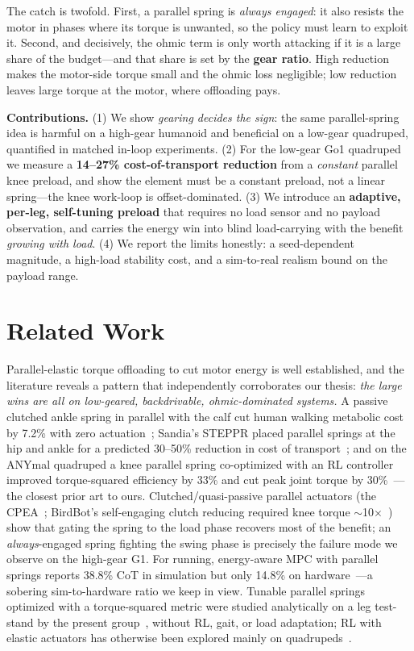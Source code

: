 \documentclass[journal]{IEEEtran}
\begin{document}
The catch is twofold. First, a parallel spring is \emph{always engaged}: it also resists the motor in phases
where its torque is unwanted, so the policy must learn to exploit it. Second, and decisively, the ohmic term is
only worth attacking if it is a large share of the budget---and that share is set by the \textbf{gear ratio}.
High reduction makes the motor-side torque small and the ohmic loss negligible; low reduction leaves large
torque at the motor, where offloading pays.

\textbf{Contributions.}
(1) We show \emph{gearing decides the sign}: the same parallel-spring idea is harmful on a high-gear humanoid
and beneficial on a low-gear quadruped, quantified in matched in-loop experiments.
(2) For the low-gear Go1 quadruped we measure a \textbf{14--27\% cost-of-transport reduction} from a
\emph{constant} parallel knee preload, and show the element must be a constant preload, not a linear
spring---the knee work-loop is offset-dominated.
(3) We introduce an \textbf{adaptive, per-leg, self-tuning preload} that requires no load sensor and no payload
observation, and carries the energy win into blind load-carrying with the benefit \emph{growing with load}.
(4) We report the limits honestly: a seed-dependent magnitude, a high-load stability cost, and a sim-to-real
realism bound on the payload range.

\section{Related Work}
\label{sec:related}
Parallel-elastic torque offloading to cut motor energy is well established, and the literature reveals a pattern
that independently corroborates our thesis: \emph{the large wins are all on low-geared, backdrivable,
ohmic-dominated systems.} A passive clutched ankle spring in parallel with the calf cut human walking metabolic
cost by 7.2\% with zero actuation~\cite{collins2015}; Sandia's STEPPR placed parallel springs at the hip and
ankle for a predicted 30--50\% reduction in cost of transport~\cite{steppr2017}; and on the ANYmal quadruped a
knee parallel spring co-optimized with an RL controller improved torque-squared efficiency by 33\% and cut peak
joint torque by 30\%~\cite{bjelonic2023}---the closest prior art to ours. Clutched/quasi-passive parallel
actuators (the CPEA~\cite{plooij2012}; BirdBot's self-engaging clutch reducing required knee torque
$\sim$10$\times$~\cite{birdbot2022}) show that gating the spring to the load phase recovers most of the benefit;
an \emph{always}-engaged spring fighting the swing phase is precisely the failure mode we observe on the
high-gear G1. For running, energy-aware MPC with parallel springs reports 38.8\% CoT in simulation but only
14.8\% on hardware~\cite{kinompc2025}---a sobering sim-to-hardware ratio we keep in view. Tunable parallel
springs optimized with a torque-squared metric were studied analytically on a leg test-stand by the present
group~\cite{belov2024}, without RL, gait, or load adaptation; RL with elastic actuators has otherwise been
explored mainly on quadrupeds~\cite{bjelonic2022}.
\end{document}
